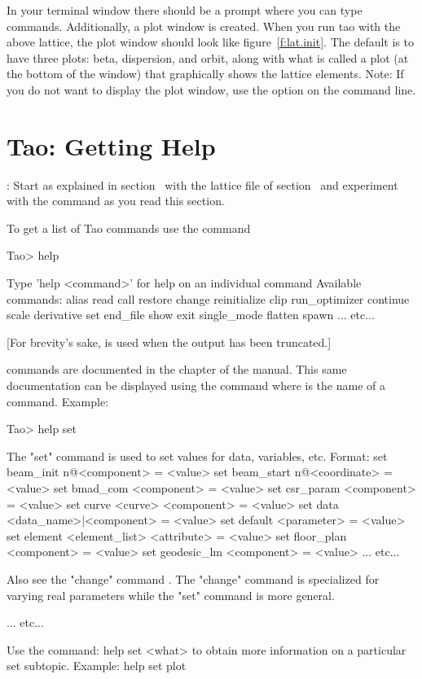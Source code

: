 \documentclass{hitec}
\newcommand{\Section}[1]{\section{#1}\vspace*{-1ex}}
\begin{document}
In your terminal window there should be a  prompt where you can type \tao commands.
Additionally, a plot window is created. When you run tao with the above lattice, the plot window
should look like figure~\ref{f:lat.init}. The default is to have three plots: beta, dispersion, and
orbit, along with what is called a  plot (at the bottom of the window) that
graphically shows the lattice elements. Note: If you do not want \tao to display the plot window,
use the  option on the command line.

\Section{Tao: Getting Help}

: Start \tao as explained in section~ with the lattice file
 of section~ and experiment with the  command
as you read this section.

To get a list of Tao commands use the  command
\begin{code}
Tao> help

Type 'help <command>' for help on an individual command
Available commands:
  alias                             read
  call                              restore
  change                            reinitialize
  clip                              run_optimizer
  continue                          scale
  derivative                        set
  end_file                          show
  exit                              single_mode
  flatten                           spawn
... etc...
\end{code}
[For brevity's sake,  is used when the output has been truncated.]

\tao commands are documented in the  chapter of the \tao manual.
This same documentation can be displayed using the  command where
 is the name of a command. Example:
\begin{code}
Tao> help set

The "set" command is used to set values for data,
variables, etc. Format:
  set beam_init {n@}<component> = <value>
  set beam_start {n@}<coordinate> = <value>
  set bmad_com <component> = <value>
  set csr_param <component> = <value>
  set curve <curve> <component> = <value>
  set data <data_name>|<component> = <value>
  set default <parameter> = <value>
  set element <element_list> <attribute> = <value>
  set floor_plan <component> = <value>
  set geodesic_lm <component> = <value>
... etc...

Also see the "change" command . The "change" command is specialized
for varying real parameters while the "set" command is more general.

... etc...

Use the command:
  help set <what>
to obtain more information on a particular set subtopic. Example:
  help set plot
\end{code}
\end{document}
